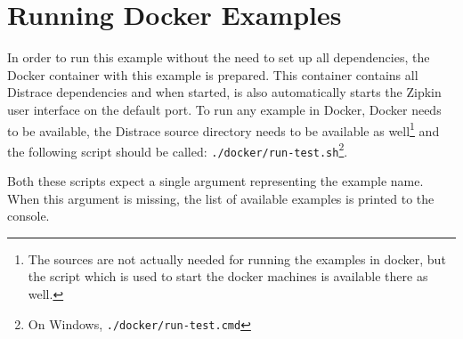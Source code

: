 \section*{Running Docker Examples}
 In order to run this example without the need to set up all dependencies, the Docker container with this example is prepared. This container contains all Distrace dependencies and when started, is also automatically starts the Zipkin user interface on the default port. To run any example in Docker, Docker needs to be available, the Distrace source directory needs to be available as well\footnote{The sources are not actually needed for running the examples in docker, but the script which is used to start the docker machines is available there as well.} and the following script should be called: \texttt{./docker/run-test.sh}\footnote{On Windows, \texttt{./docker/run-test.cmd}}. 
 
Both these scripts expect a single argument representing the example name. When this argument is missing, the list of available examples is printed to the console.